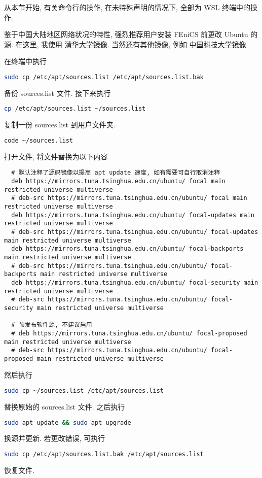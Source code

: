 \documentclass[fontset=founder]{ctexart}
\begin{document}
从本节开始,
有关命令行的操作,
在未特殊声明的情况下,
全部为 WSL 终端中的操作.

鉴于中国大陆地区网络状况的特性,
强烈推荐用户安装 FEniCS 前更改 Ubuntu 的源.
在这里,
我使用%
\href{https://mirrors.tuna.tsinghua.edu.cn/help/ubuntu/}{清华大学镜像}.
当然还有其他镜像,
例如%
\href{https://mirrors.ustc.edu.cn/help/ubuntu.html}{中国科技大学镜像}.

在终端中执行
\begin{lstlisting}[language = bash]
  sudo cp /etc/apt/sources.list /etc/apt/sources.list.bak
\end{lstlisting}
备份 \textsf{sources.list} 文件.
接下来执行
\begin{lstlisting}[language = bash]
  cp /etc/apt/sources.list ~/sources.list
\end{lstlisting}
复制一份 \textsf{sources.list} 到用户文件夹.
\begin{lstlisting}[language = bash]
  code ~/sources.list
\end{lstlisting}
打开文件,
将文件替换为以下内容
\begin{lstlisting}
  # 默认注释了源码镜像以提高 apt update 速度, 如有需要可自行取消注释
  deb https://mirrors.tuna.tsinghua.edu.cn/ubuntu/ focal main restricted universe multiverse
  # deb-src https://mirrors.tuna.tsinghua.edu.cn/ubuntu/ focal main restricted universe multiverse
  deb https://mirrors.tuna.tsinghua.edu.cn/ubuntu/ focal-updates main restricted universe multiverse
  # deb-src https://mirrors.tuna.tsinghua.edu.cn/ubuntu/ focal-updates main restricted universe multiverse
  deb https://mirrors.tuna.tsinghua.edu.cn/ubuntu/ focal-backports main restricted universe multiverse
  # deb-src https://mirrors.tuna.tsinghua.edu.cn/ubuntu/ focal-backports main restricted universe multiverse
  deb https://mirrors.tuna.tsinghua.edu.cn/ubuntu/ focal-security main restricted universe multiverse
  # deb-src https://mirrors.tuna.tsinghua.edu.cn/ubuntu/ focal-security main restricted universe multiverse
  
  # 预发布软件源, 不建议启用
  # deb https://mirrors.tuna.tsinghua.edu.cn/ubuntu/ focal-proposed main restricted universe multiverse
  # deb-src https://mirrors.tuna.tsinghua.edu.cn/ubuntu/ focal-proposed main restricted universe multiverse
\end{lstlisting}
然后执行
\begin{lstlisting}[language = bash]
  sudo cp ~/sources.list /etc/apt/sources.list
\end{lstlisting}
替换原始的 \textsf{sources.list} 文件.
之后执行
\begin{lstlisting}[language=bash]
  sudo apt update && sudo apt upgrade
\end{lstlisting}
换源并更新.
若更改错误,
可执行
\begin{lstlisting}[language=bash]
  sudo cp /etc/apt/sources.list.bak /etc/apt/sources.list
\end{lstlisting}
恢复文件.
\end{document}
